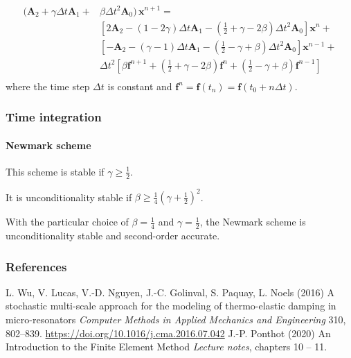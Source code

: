 \documentclass[10pt,xcolor=pdftex,dvipsnames,table]{beamer}
\begin{document}
\begin{frame}
	\begin{equation*}
		\begin{split}
			(\mathbf{A}_2 + \gamma\Delta t \mathbf{A}_1 +& \beta \Delta t^2 \mathbf{A}_0) \,\boldsymbol{x}^{n+1} = \\
			& \left[ 2\mathbf{A}_2 - (1-2\gamma)\Delta t \mathbf{A}_1 - (\tfrac{1}{2}+\gamma-2\beta)\Delta t^2 \mathbf{A}_0 \right] \boldsymbol{x}^{n}+ \\
			& \left[ -\mathbf{A}_2 - (\gamma-1)\Delta t \mathbf{A}_1 - (\tfrac{1}{2}-\gamma+\beta)\Delta t^2 \mathbf{A}_0 \right] \boldsymbol{x}^{n-1}+ \\
			& \Delta t^2 \left[ \beta\boldsymbol{f}^{n+1} + (\tfrac{1}{2}+\gamma-2\beta)\boldsymbol{f}^{n} + (\tfrac{1}{2}-\gamma+\beta)\boldsymbol{f}^{n-1} \right] \\
		\end{split}
	\end{equation*}
	where the time step $\Delta t$ is constant and $\boldsymbol{f}^{n}=\boldsymbol{f}(t_n)=\boldsymbol{f}(t_0+n
	\Delta t)$. 	
\end{frame}

\begin{frame}
	\frametitle{ Time integration }
	\framesubtitle{ Newmark scheme  }
	
	This scheme is stable if $\gamma\geq\frac{1}{2}$. 
	
	It is unconditionality stable if $\beta\geq\frac{1}{4}(\gamma+\frac{1}{2})^2$. 
	
	With the particular choice of $\beta=\frac{1}{4}$ and
	$\gamma=\frac{1}{2}$, the Newmark scheme is unconditionality stable and second-order accurate.
	
		
\end{frame}


\begin{frame}
	\frametitle{References}
	\footnotesize{
		\begin{thebibliography}{99} %
			 L. Wu, V. Lucas, V.-D. Nguyen, J.-C. Golinval, S. Paquay, L. Noels (2016)
			\newblock A stochastic multi-scale approach for the modeling of thermo-elastic damping in micro-resonators
			\newblock \emph{Computer Methods in Applied Mechanics and Engineering} 310, 802--839.
			\newblock \url{https://doi.org/10.1016/j.cma.2016.07.042}
			 J.-P. Ponthot (2020)
			\newblock An Introduction to the Finite Element Method
			\newblock \emph{Lecture notes}, chapters 10 -- 11.
		\end{thebibliography}
	}
\end{frame}

%	
%	
\end{document}
